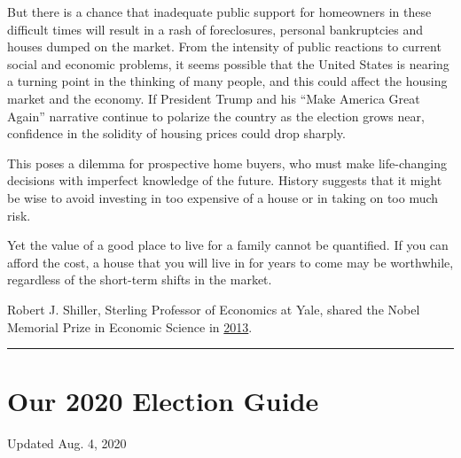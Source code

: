 But there is a chance that inadequate public support for homeowners in
these difficult times will result in a rash of foreclosures, personal
bankruptcies and houses dumped on the market. From the intensity of
public reactions to current social and economic problems, it seems
possible that the United States is nearing a turning point in the
thinking of many people, and this could affect the housing market and
the economy. If President Trump and his ``Make America Great Again''
narrative continue to polarize the country as the election grows near,
confidence in the solidity of housing prices could drop sharply.

This poses a dilemma for prospective home buyers, who must make
life-changing decisions with imperfect knowledge of the future. History
suggests that it might be wise to avoid investing in too expensive of a
house or in taking on too much risk.

Yet the value of a good place to live for a family cannot be quantified.
If you can afford the cost, a house that you will live in for years to
come may be worthwhile, regardless of the short-term shifts in the
market.

Robert J. Shiller, Sterling Professor of Economics at Yale, shared the
Nobel Memorial Prize in Economic Science in
\href{https://www.nytimes3xbfgragh.onion/2013/10/15/business/3-american-professors-awarded-nobel-in-economic-sciences.html?_r=0}{2013}.

\begin{center}\rule{0.5\linewidth}{\linethickness}\end{center}

\hypertarget{our-2020-election-guide}{%
\section{Our 2020 Election Guide}\label{our-2020-election-guide}}

Updated Aug. 4, 2020

